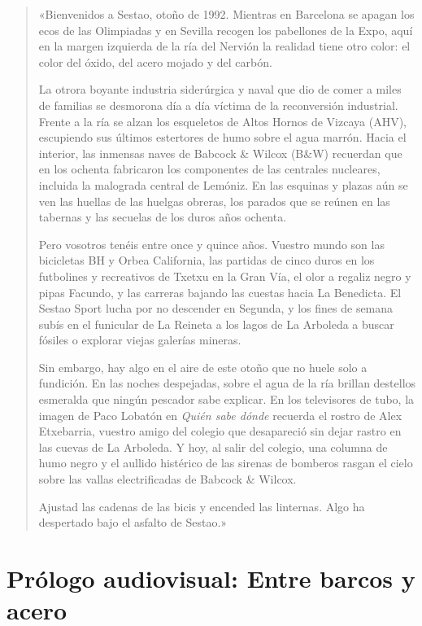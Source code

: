 \begin{quote}
«Bienvenidos a Sestao, otoño de 1992. Mientras en Barcelona se apagan los ecos de las Olimpiadas y en Sevilla recogen los pabellones de la Expo, aquí en la margen izquierda de la ría del Nervión la realidad tiene otro color: el color del óxido, del acero mojado y del carbón.

La otrora boyante industria siderúrgica y naval que dio de comer a miles de familias se desmorona día a día víctima de la reconversión industrial. Frente a la ría se alzan los esqueletos de Altos Hornos de Vizcaya (AHV), escupiendo sus últimos estertores de humo sobre el agua marrón. Hacia el interior, las inmensas naves de Babcock \& Wilcox (B\&W) recuerdan que en los ochenta fabricaron los componentes de las centrales nucleares, incluida la malograda central de Lemóniz. En las esquinas y plazas aún se ven las huellas de las huelgas obreras, los parados que se reúnen en las tabernas y las secuelas de los duros años ochenta.

Pero vosotros tenéis entre once y quince años. Vuestro mundo son las bicicletas BH y Orbea California, las partidas de cinco duros en los futbolines y recreativos de Txetxu en la Gran Vía, el olor a regaliz negro y pipas Facundo, y las carreras bajando las cuestas hacia La Benedicta. El Sestao Sport lucha por no descender en Segunda, y los fines de semana subís en el funicular de La Reineta a los lagos de La Arboleda a buscar fósiles o explorar viejas galerías mineras.

Sin embargo, hay algo en el aire de este otoño que no huele solo a fundición. En las noches despejadas, sobre el agua de la ría brillan destellos esmeralda que ningún pescador sabe explicar. En los televisores de tubo, la imagen de Paco Lobatón en \emph{Quién sabe dónde} recuerda el rostro de Alex Etxebarria, vuestro amigo del colegio que desapareció sin dejar rastro en las cuevas de La Arboleda. Y hoy, al salir del colegio, una columna de humo negro y el aullido histérico de las sirenas de bomberos rasgan el cielo sobre las vallas electrificadas de Babcock \& Wilcox.

Ajustad las cadenas de las bicis y encended las linternas. Algo ha despertado bajo el asfalto de Sestao.»
\end{quote}

\section{Prólogo audiovisual: Entre barcos y acero}

